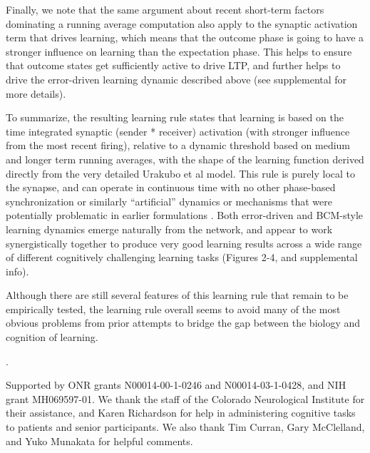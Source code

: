 \documentclass[11pt,twoside]{article}
\newcounter{lastnote}
\newenvironment{scilastnote}{%
\setcounter{lastnote}{\value{enumiv}}%
\addtocounter{lastnote}{+1}%
\begin{list}%
{\arabic{lastnote}.}
{\setlength{\leftmargin}{.22in}}
{\setlength{\labelsep}{.5em}}}
{\end{list}}
\begin{document}
Finally, we note that the same argument about recent short-term factors
dominating a running average computation also apply to the synaptic activation
term that drives learning, which means that the outcome phase is going to have
a stronger influence on learning than the expectation phase.  This helps to
ensure that outcome states get sufficiently active to drive LTP, and further
helps to drive the error-driven learning dynamic described above (see
supplemental for more details).

To summarize, the resulting learning rule states that learning is based on the
time integrated synaptic (sender * receiver) activation (with stronger
influence from the most recent firing), relative to a dynamic threshold based
on medium and longer term running averages, with the shape of the learning
function derived directly from the very detailed Urakubo et al model.  This
rule is purely local to the synapse, and can operate in continuous time with
no other phase-based synchronization or similarly ``artificial'' dynamics or
mechanisms that were potentially problematic in earlier formulations
\cite{OReillyMcClelland00}.  Both error-driven and BCM-style learning dynamics
emerge naturally from the network, and appear to work synergistically together
to produce very good learning results across a wide range of different
cognitively challenging learning tasks (Figures 2-4, and supplemental info).

Although there are still several features of this learning rule that remain to
be empirically tested, the learning rule overall seems to avoid many of the
most obvious problems from prior attempts to bridge the gap between the
biology and cognition of learning.





\begin{scilastnote}
\item Supported by ONR grants N00014-00-1-0246 and N00014-03-1-0428,
  and NIH grant MH069597-01.  We thank the staff of the Colorado
  Neurological Institute for their assistance, and Karen Richardson
  for help in administering cognitive tasks to patients and senior
  participants.  We also thank Tim Curran, Gary McClelland, and Yuko
  Munakata for helpful comments.
\end{scilastnote}
\end{document}
